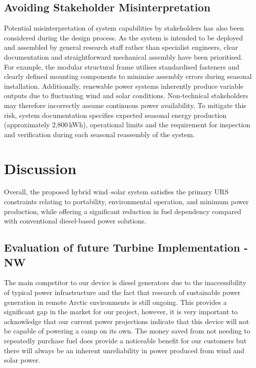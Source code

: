 \documentclass[11pt,a4paper]{article}
\begin{document}
\subsection{Avoiding Stakeholder Misinterpretation}
Potential misinterpretation of system capabilities by stakeholders has also been considered during the design process. As the system is intended to be deployed and assembled by general research staff rather than specialist engineers, clear documentation and straightforward mechanical assembly have been prioritised. For example, the modular structural frame utilises standardised fasteners and clearly defined mounting components to minimise assembly errors during seasonal installation. Additionally, renewable power systems inherently produce variable outputs due to fluctuating wind and solar conditions. Non-technical stakeholders may therefore incorrectly assume continuous power availability. To mitigate this risk, system documentation specifies expected seasonal energy production (approximately 2,800\,kWh), operational limits and the requirement for inspection and verification during each seasonal reassembly of the system.


\section{Discussion} %
Overall, the proposed hybrid wind–solar system satisfies the primary URS constraints relating to portability, environmental operation, and minimum power production, while offering a significant reduction in fuel dependency compared with conventional diesel-based power solutions.

\subsection{Evaluation of future Turbine Implementation - NW}
The main competitor to our device is diesel generators due to the inaccessibility of typical power infrastructure and the fact that research of sustainable power generation in remote Arctic environments is still ongoing. This provides a significant gap in the market for our project, however, it is very important to acknowledge that our current power projections indicate that this device will not be capable of powering a camp on its own. The money saved from not needing to repeatedly purchase fuel does provide a noticeable benefit for our customers but there will always be an inherent unreliability in power produced from wind and solar power.
\end{document}
